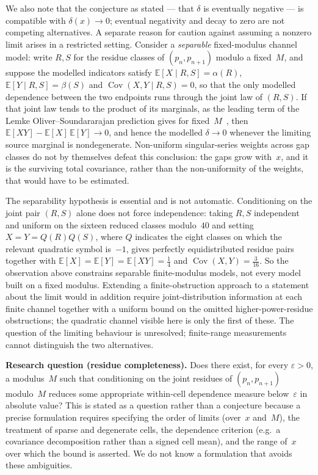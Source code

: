 \documentclass[11pt]{amsart}
\theoremstyle{definition}
\newcommand{\E}{\mathbb{E}}
\begin{document}
We also note that the conjecture as stated --- that $\delta$ is eventually
negative --- is compatible with $\delta(x) \to 0$; eventual negativity and
decay to zero are not competing alternatives. A separate
reason for caution against assuming a nonzero limit arises in a restricted setting.
Consider a \emph{separable} fixed-modulus channel model: write $R, S$ for the
residue classes of $(p_n, p_{n+1})$ modulo a fixed~$M$, and suppose the
modelled indicators satisfy $\E[X \mid R,S] = \alpha(R)$,
$\E[Y \mid R,S] = \beta(S)$ and $\operatorname{Cov}(X, Y \mid R,S) = 0$, so
that the only modelled dependence between the two endpoints runs through the
joint law of $(R,S)$. If that joint law tends to the product of its
marginals, as the leading term of the Lemke Oliver--Soundararajan prediction
gives for fixed~$M$~\cite{LOS2016}, then
$\E[XY] - \E[X]\,\E[Y] \to 0$, and hence the modelled $\delta \to 0$ whenever
the limiting source marginal is nondegenerate. Non-uniform singular-series
weights across gap classes do not by themselves defeat this conclusion: the
gaps grow with~$x$, and it is the surviving total covariance, rather than the
non-uniformity of the weights, that would have to be estimated.

The separability hypothesis is essential and is not automatic. Conditioning
on the joint pair $(R,S)$ alone does not force independence: taking $R,S$
independent and uniform on the sixteen reduced classes modulo~$40$ and setting
$X = Y = Q(R)Q(S)$, where $Q$ indicates the eight classes on which the
relevant quadratic symbol is~$-1$, gives perfectly equidistributed residue
pairs together with $\E[X] = \E[Y] = \E[XY] = \tfrac14$ and
$\operatorname{Cov}(X,Y) = \tfrac{3}{16}$. So the observation above constrains
separable finite-modulus models, not every model built on a fixed modulus.
Extending a finite-obstruction approach to a statement about the limit would
in addition require joint-distribution information at each finite channel
together with a uniform bound on the omitted higher-power-residue
obstructions; the quadratic channel visible here is only the first of these.
The question of the limiting behaviour is unresolved; finite-range
measurements cannot distinguish the two alternatives.

\textbf{Research question (residue completeness).}
Does there exist, for every $\varepsilon > 0$, a modulus~$M$ such that
conditioning on the joint residues of $(p_n, p_{n+1})$ modulo~$M$ reduces
some appropriate within-cell dependence measure below~$\varepsilon$ in
absolute value? This is stated as a question rather than a conjecture because
a precise formulation requires specifying the order of limits (over~$x$
and~$M$), the treatment of sparse and degenerate cells, the dependence
criterion (e.g.\ a covariance decomposition rather than a signed cell mean),
and the range of~$x$ over which the bound is asserted. We do not know a
formulation that avoids these ambiguities.
\end{document}
